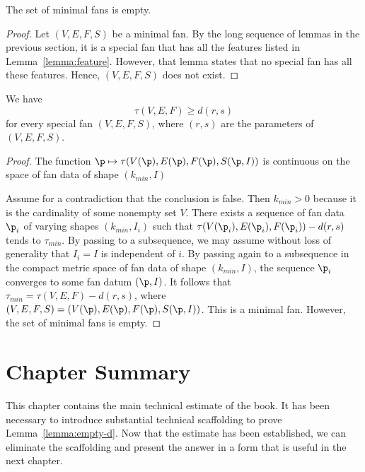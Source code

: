 \begin{lemma}[]\label{lemma:min-empty}  
The set of minimal fans is empty.
\end{lemma}

\begin{proof} Let $(V,E,F,S)$ be a minimal fan.  By the long sequence
  of lemmas in the previous section, it is a special fan that has all
  the features listed in Lemma~\ref{lemma:feature}.  However, that
  lemma states that no special fan has all these features.  Hence,
  $(V,E,F,S)$ does not exist.
\end{proof}

\begin{lemma}
\label{lemma:empty-d}
We have
\[ 
\tau(V,E,F) \ge d (r,s)
\] 
for every special fan $(V,E,F,S)$, where $(r,s)$ are the parameters of
$(V,E,F,S)$.
\end{lemma}

\begin{proof} 
The function $\p\mapsto \tau(V(\p),E(\p),F(\p),S(\p,I))$ is
continuous on the space of fan data of shape $(k_{min},I)$

Assume for a contradiction that the conclusion is false.  Then
$k_{min}>0$ because it is the cardinality of some nonempty set $V$.
There exists a sequence of fan data $\p_i$ of varying shapes
$(k_{min},I_i)$ such that $\tau(V(\p_i),E(\p_i),F(\p_i))-d(r,s)$ tends
to $\tau_{min}$.  By passing to a subsequence, we may assume without
loss of generality that $I_i = I$ is independent of $i$.  By passing
again to a subsequence in the compact metric space of fan data of
shape $(k_{min},I)$, the sequence $\p_i$ converges to some fan datum
$(\p,I)$.  It follows that $\tau_{min} = \tau(V,E,F)-d(r,s)$, where
$(V,E,F,S)=(V(\p),E(\p),F(\p),S(\p,I))$.  This is a minimal fan.
However, the set of minimal fans is empty.
\end{proof}



\section{Chapter Summary}

This chapter contains the main technical estimate of the book.  It
has been necessary to introduce substantial technical scaffolding to
prove Lemma~\ref{lemma:empty-d}.  Now that the estimate has been established, we
can eliminate the scaffolding and present the answer in a form that
is useful in the next chapter.

